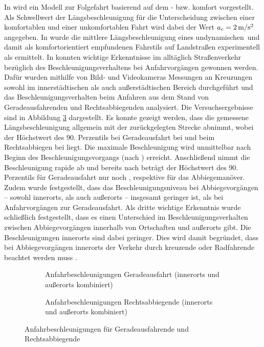 In \cite{Liu.2005} wird ein Modell zur Folgefahrt basierend auf dem - bzw. komfort vorgestellt. Als Schwellwert der Längsbeschleunigung für die Unterscheidung zwischen einer komfortablen und einer unkomfortablen Fahrt wird dabei der Wert $a_c = 2\,\mathrm{m/s^2}$ angegeben. In \cite{Radke.2013} wurde die mittlere Längsbeschleunigung eines \glqq undynamischen\grqq~und damit als komfortorientiert empfundenen Fahrstils auf Landstraßen experimentell als  ermittelt. In \cite{Krause.2002} konnten wichtige Erkenntnisse im alltäglich Straßenverkehr bezüglich des Beschleunigungsverhaltens bei Anfahrvorgängen gewonnen werden. Dafür wurden mithilfe von Bild- und Videokameras Messungen an Kreuzungen sowohl im innerstädtischen als auch außerstädtischen Bereich durchgeführt und das Beschleunigungsverhalten beim Anfahren aus dem Stand von Geradeausfahrenden und Rechtsabbiegenden analysiert. Die Versuchsergebnisse sind in Abbildung \ref{fig:ax_s_krause} dargestellt. Es konnte gezeigt werden, dass die gemessene Längsbeschleunigung allgemein mit der zurückgelegten Strecke abnimmt, wobei der Höchstwert des 90. Perzentils bei Geradeausfahrt bei  und beim Rechtsabbiegen bei  liegt. Die maximale Beschleunigung wird unmittelbar nach Beginn des Beschleunigungsvorgangs (nach ) erreicht. Anschließend nimmt die Beschleunigung rapide ab und bereits nach  beträgt der Höchstwert des 90. Perzentils für Geradeausfahrt nur noch , respektive  für das Abbiegemanöver. Zudem wurde festgestellt, dass das Beschleunigungsniveau bei Abbiegevorgängen -- sowohl innerorts, als auch außerorts -- insgesamt geringer ist, als bei Anfahrvorgängen zur Geradeausfahrt. Als dritte wichtige Erkenntnis wurde schließlich festgestellt, dass es einen Unterschied im Beschleunigungsverhalten zwischen Abbiegevorgängen innerhalb von Ortschaften und außerorts gibt. Die Beschleunigungen innerorts sind dabei geringer. Dies wird damit begründet, dass bei Abbiegevorgängen innerorts der Verkehr durch kreuzende  oder Radfahrende beachtet werden muss \cite{Krause.2002}. 
\begin{figure}[h]
	\centering
	\begin{subfigure}[b]{0.49\linewidth}
		\centering
		\fontsize{32pt}{16pt}\selectfont
		\caption{Anfahrbeschleunigungen Geradeausfahrt (innerorts und außerorts kombiniert)}
		\label{fig:ax_s_geradeaus_krause}
	\end{subfigure}
	\hfill
	\begin{subfigure}[b]{0.49\textwidth}
		\centering
		\fontsize{32pt}{16pt}\selectfont
		\caption{Anfahrbeschleunigungen Rechtsabbiegende (innerorts und außerorts kombiniert)}
		\label{fig:ax_s_abbiegen_krause}
	\end{subfigure}
	\caption{Anfahrbeschleunigungen für Geradeausfahrende und Rechtsabbiegende \cite{Krause.2002}}
	\label{fig:ax_s_krause}
\end{figure}
